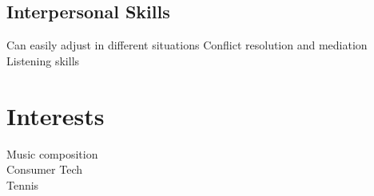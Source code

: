 \documentclass[draft]{dske-resume-openfont}
\begin{document}
\begin{minipage}[t]{0.33\textwidth}
\sectionsep

\subsection{Interpersonal Skills}
Can easily adjust in different situations \textbullet{} Conflict resolution and mediation \textbullet{} Listening skills\\

\sectionsep

\section{Interests}
Music composition\\
Consumer Tech\\
Tennis\\



%
%

\end{minipage} 
\hfill
\end{document}
